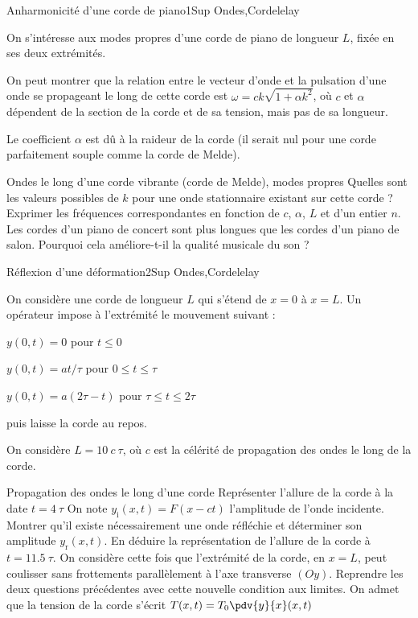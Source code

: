 
\begin{exercise}{Anharmonicité d'une corde de piano}{1}{Sup}
{Ondes,Corde}{lelay}

On s'intéresse aux modes propres d'une corde de piano de longueur $L$, fixée en ses deux extrémités. 

On peut montrer que la relation entre le vecteur d'onde et la pulsation d'une onde se propageant le long de cette corde est $\omega = ck \sqrt{1+ \alpha k^2}$, où $c$ et $\alpha$ dépendent de la section de la corde et de sa tension, mais pas de sa longueur.

Le coefficient $\alpha$ est dû à la raideur de la corde (il serait nul pour une corde parfaitement souple comme la corde de Melde).

\begin{questions}
    \questioncours Ondes le long d'une corde vibrante (corde de Melde), modes propres
    \question Quelles sont les valeurs possibles de $k$ pour une onde stationnaire existant sur cette corde ? Exprimer les fréquences correspondantes en fonction de $c$, $\alpha$, $L$ et d'un entier $n$.
    \question Les cordes d'un piano de concert sont plus longues que les cordes d'un piano de salon. Pourquoi cela améliore-t-il la qualité musicale du son ?
\end{questions}
\end{exercise}

\begin{exercise}{Réflexion d'une déformation}{2}{Sup}
{Ondes,Corde}{lelay}

On considère une corde de longueur $L$ qui s'étend de $x = 0$ à $x = L$. Un opérateur impose à l'extrémité le mouvement suivant :

$y(0, t) = 0$ pour $t \leq 0$
    
$y(0, t) = at/\tau$ pour $0 \leq t \leq \tau$
    
$y(0, t) = a(2\tau-t)$ pour $\tau \leq t \leq 2\tau$
    
puis laisse la corde au repos.

On considère $L = 10\ c\ \tau$, où $c$ est la célérité de propagation des ondes le long de la corde.
 
\begin{questions}
    \questioncours Propagation des ondes le long d'une corde
    \question Représenter l'allure de la corde à la date $t = 4\ \tau$
    \question On note $y_\text{i}(x, t) = F(x-ct)$ l'amplitude de l'onde incidente. Montrer qu'il existe nécessairement une onde réfléchie et déterminer son amplitude $y_\text{r}(x, t)$.
    \question En déduire la représentation de l'allure de la corde à $t = 11.5\  \tau$.
    \question On considère cette fois que l'extrémité de la corde, en $x=L$, peut coulisser sans frottements parallèlement à l'axe transverse $(Oy)$. Reprendre les deux questions précédentes avec cette nouvelle condition aux limites. On admet que la tension de la corde s'écrit $T(x, t) = T_0\pdv{y}{x}(x, t)$
\end{questions}
\end{exercise}


